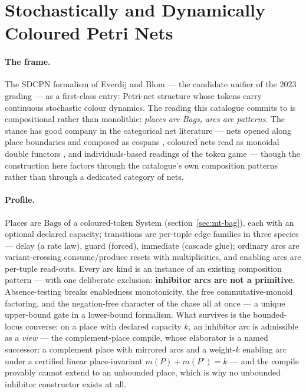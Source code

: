 \section{Stochastically and Dynamically Coloured Petri Nets}
\label{sec:mt-sdcpn}

\paragraph{The frame.} The SDCPN formalism of Everdij and Blom ---
the candidate unifier of the 2023 grading --- as a first-class entry:
Petri-net structure whose tokens carry continuous stochastic colour
dynamics. The reading this catalogue commits to is compositional
rather than monolithic: \emph{places are Bags, arcs are patterns}.
The stance has good company in the categorical net literature ---
nets opened along place boundaries and composed as cospans
\cite{baez18}, coloured nets read as monoidal double functors
\cite{master25}, and individuals-based readings of the token game
\cite{kock20} --- though the construction here factors through the
catalogue's own composition patterns rather than through a dedicated
category of nets.

\paragraph{Profile.} Places are $\mathrm{Bag}$s of a coloured-token
System (section~\ref{sec:mt-bag}), each with an optional declared
capacity; transitions are per-tuple edge families in three species
--- delay (a rate law), guard (forced), immediate (cascade glue);
ordinary arcs are variant-crossing consume/produce resets with
multiplicities, and enabling arcs are per-tuple read-outs. Every arc
kind is an instance of an existing composition pattern --- with one
deliberate exclusion: \textbf{inhibitor arcs are not a primitive}.
Absence-testing breaks enabledness monotonicity, the free
commutative-monoid factoring, and the negation-free character of the
chase all at once --- a unique upper-bound gate in a lower-bound
formalism. What survives is the bounded-locus converse: on a place
with declared capacity $k$, an inhibitor arc is admissible as a
\emph{view} --- the complement-place compile, whose elaborator is a
named successor: a complement place with mirrored arcs and a
weight-$k$ enabling arc under a certified linear place-invariant
$m(P) + m(P') = k$ --- and the compile provably cannot extend to an
unbounded place, which is why no unbounded inhibitor constructor
exists at all.

